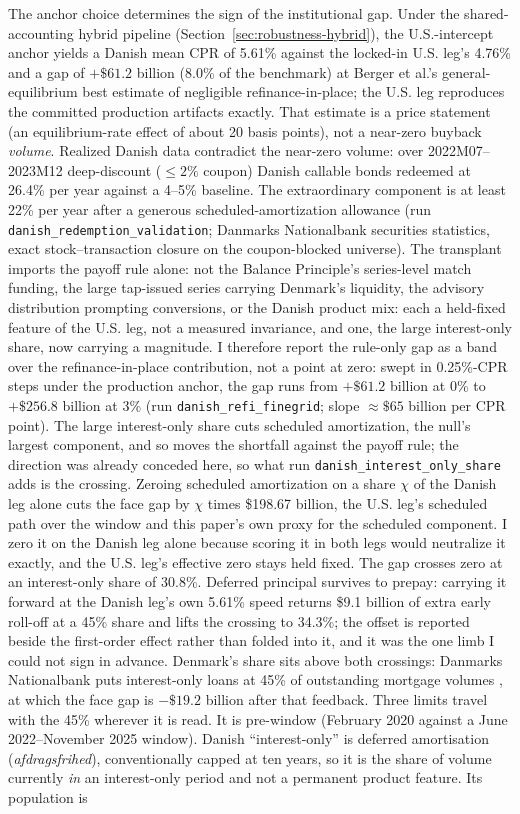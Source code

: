 \documentclass[12pt]{article}
\begin{document}
The anchor choice determines the sign of the institutional gap. Under the shared-accounting hybrid pipeline (Section~\ref{sec:robustness-hybrid}), the U.S.-intercept anchor yields a Danish mean CPR of 5.61\% against the locked-in U.S. leg's 4.76\% and a gap of $+\$61.2$ billion (8.0\% of the benchmark) at Berger et al.'s general-equilibrium best estimate of negligible refinance-in-place; the U.S. leg reproduces the committed production artifacts exactly. That estimate is a price statement (an equilibrium-rate effect of about 20 basis points), not a near-zero buyback \emph{volume}. Realized Danish data contradict the near-zero volume: over 2022M07--2023M12 deep-discount ($\leq 2\%$ coupon) Danish callable bonds redeemed at 26.4\% per year against a 4--5\% baseline. The extraordinary component is at least 22\% per year after a generous scheduled-amortization allowance (run \texttt{danish\_redemption\_validation}; Danmarks Nationalbank securities statistics, exact stock--transaction closure on the coupon-blocked universe). The transplant imports the payoff rule alone: not the Balance Principle's series-level match funding, the large tap-issued series carrying Denmark's liquidity, the advisory distribution prompting conversions, or the Danish product mix: each a held-fixed feature of the U.S. leg, not a measured invariance, and one, the large interest-only share, now carrying a magnitude. I therefore report the rule-only gap as a band over the refinance-in-place contribution, not a point at zero: swept in 0.25\%-CPR steps under the production anchor, the gap runs from $+\$61.2$ billion at 0\% to $+\$256.8$ billion at 3\% (run \texttt{danish\_refi\_finegrid}; slope $\approx \$65$ billion per CPR point). The large interest-only share cuts scheduled amortization, the null's largest component, and so moves the shortfall against the payoff rule; the direction was already conceded here, so what run \texttt{danish\_interest\_only\_share} adds is the crossing. Zeroing scheduled amortization on a share $\chi$ of the Danish leg alone cuts the face gap by $\chi$ times \$198.67 billion, the U.S. leg's scheduled path over the window and this paper's own proxy for the scheduled component. I zero it on the Danish leg alone because scoring it in both legs would neutralize it exactly, and the U.S. leg's effective zero stays held fixed. The gap crosses zero at an interest-only share of 30.8\%. Deferred principal survives to prepay: carrying it forward at the Danish leg's own 5.61\% speed returns \$9.1 billion of extra early roll-off at a 45\% share and lifts the crossing to 34.3\%; the offset is reported beside the first-order effect rather than folded into it, and it was the one limb I could not sign in advance. Denmark's share sits above both crossings: Danmarks Nationalbank puts interest-only loans at 45\% of outstanding mortgage volumes \citep{nationalbanken2020}, at which the face gap is $-\$19.2$ billion after that feedback. Three limits travel with the 45\% wherever it is read. It is pre-window (February 2020 against a June 2022--November 2025 window). Danish ``interest-only'' is deferred amortisation (\emph{afdragsfrihed}), conventionally capped at ten years, so it is the share of volume currently \emph{in} an interest-only period and not a permanent product feature. Its population is 
\end{document}
